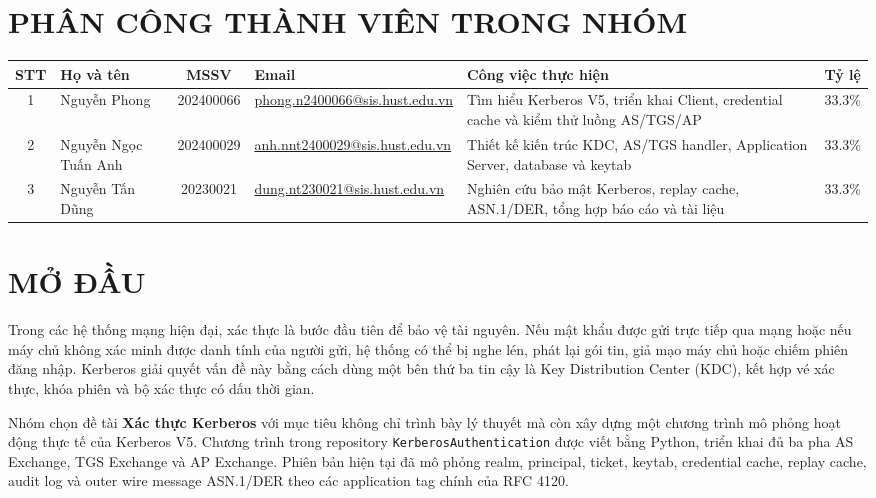 \documentclass[12pt]{article}
\begin{document}
\newpage
\section*{PHÂN CÔNG THÀNH VIÊN TRONG NHÓM}

\begin{table}[H]
\centering
\renewcommand{\arraystretch}{1.35}
\begin{tabularx}{\textwidth}{|c|p{3.2cm}|c|>{\raggedright\arraybackslash}X|>{\raggedright\arraybackslash}X|c|}
\hline
\textbf{STT} & \textbf{Họ và tên} & \textbf{MSSV} & \textbf{Email} & \textbf{Công việc thực hiện} & \textbf{Tỷ lệ} \\
\hline
1 & Nguyễn Phong & 202400066 & \url{phong.n2400066@sis.hust.edu.vn} & Tìm hiểu Kerberos V5, triển khai Client, credential cache và kiểm thử luồng AS/TGS/AP & 33.3\% \\
\hline
2 & Nguyễn Ngọc Tuấn Anh & 202400029 & \url{anh.nnt2400029@sis.hust.edu.vn} & Thiết kế kiến trúc KDC, AS/TGS handler, Application Server, database và keytab & 33.3\% \\
\hline
3 & Nguyễn Tấn Dũng & 20230021 & \url{dung.nt230021@sis.hust.edu.vn} & Nghiên cứu bảo mật Kerberos, replay cache, ASN.1/DER, tổng hợp báo cáo và tài liệu & 33.3\% \\
\hline
\end{tabularx}
\end{table}

\newpage
\section*{MỞ ĐẦU}

Trong các hệ thống mạng hiện đại, xác thực là bước đầu tiên để bảo vệ tài nguyên. Nếu mật khẩu được gửi trực tiếp qua mạng hoặc nếu máy chủ không xác minh được danh tính của người gửi, hệ thống có thể bị nghe lén, phát lại gói tin, giả mạo máy chủ hoặc chiếm phiên đăng nhập. Kerberos giải quyết vấn đề này bằng cách dùng một bên thứ ba tin cậy là Key Distribution Center (KDC), kết hợp vé xác thực, khóa phiên và bộ xác thực có dấu thời gian.

Nhóm chọn đề tài \textbf{Xác thực Kerberos} với mục tiêu không chỉ trình bày lý thuyết mà còn xây dựng một chương trình mô phỏng hoạt động thực tế của Kerberos V5. Chương trình trong repository \texttt{KerberosAuthentication} được viết bằng Python, triển khai đủ ba pha AS Exchange, TGS Exchange và AP Exchange. Phiên bản hiện tại đã mô phỏng realm, principal, ticket, keytab, credential cache, replay cache, audit log và outer wire message ASN.1/DER theo các application tag chính của RFC 4120.
\end{document}
